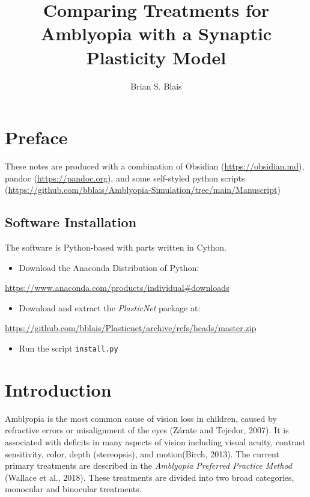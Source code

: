 \documentclass[
  onecolumn]{article}
\title{Comparing Treatments for Amblyopia with a Synaptic Plasticity
Model}
\author{Brian S. Blais}
\date{}
\providecommand{\tightlist}{%
  \setlength{\itemsep}{0pt}\setlength{\parskip}{0pt}}
\begin{document}
\maketitle

{
\hypersetup{linkcolor=}
\setcounter{tocdepth}{3}
\tableofcontents
}
\hypertarget{preface}{%
\section*{Preface}\label{preface}}

These notes are produced with a combination of Obsidian
(\url{https://obsidian.md}), pandoc (\url{https://pandoc.org}), and some
self-styled python scripts
(\url{https://github.com/bblais/Amblyopia-Simulation/tree/main/Manuscript})

\hypertarget{software-installation}{%
\subsection*{Software Installation}\label{software-installation}}

The software is Python-based with parts written in Cython.

\begin{itemize}
\tightlist
\item
  Download the Anaconda Distribution of Python:
\end{itemize}

\url{https://www.anaconda.com/products/individual\#downloads}

\begin{itemize}
\tightlist
\item
  Download and extract the \emph{PlasticNet} package at:
\end{itemize}

\url{https://github.com/bblais/Plasticnet/archive/refs/heads/master.zip}

\begin{itemize}
\tightlist
\item
  Run the script \texttt{install.py}
\end{itemize}

\hypertarget{introduction}{%
\section{Introduction}\label{introduction}}

Amblyopia is the most common cause of vision loss in children, caused by
refractive errors or misalignment of the eyes (Zárate and Tejedor,
2007). It is associated with deficits in many aspects of vision
including visual acuity, contrast sensitivity, color, depth
(stereopsis), and motion(Birch, 2013). The current primary treatments
are described in the \emph{Amblyopia Preferred Practice Method} (Wallace
et al., 2018). These treatments are divided into two broad categories,
monocular and binocular treatments.
\end{document}
